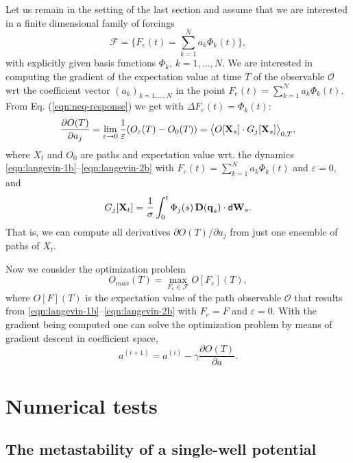 \documentclass[]{tMPH2e}
\newcommand{\vect}[1]{\textbf{\textit{#1}}}
\newcommand{\dd}{\textsf{d}}
\newcommand{\eps}{\varepsilon}
\begin{document}
Let us remain in the setting of the last section and assume that we are interested in a finite dimensional family of forcings
\[
\mathcal{F}=\{F_e(t)=\sum_{k=1}^N a_k \Phi_k(t)\},
\]
with explicitly given basis functions $\Phi_k$, $k=1,\ldots,N$.
We are interested in computing the gradient of the expectation value at time $T$ of the observable $\mathcal{O}$ wrt the coefficient vector $(a_k)_{k=1,\ldots,N}$ in the point $F_e(t)=\sum_{k=1}^N a_k \Phi_k(t)$. From Eq. (\ref{eqn:neq-response}) we get with $\Delta F_e(t)=\Phi_k(t)$:
\[
\frac{\partial O(T)}{\partial a_j} = \lim_{\eps\to 0}\frac{1}{\eps}( O_\eps(T) -
  O_0(T))=\big\langle O[\vect X_s]\cdot G_j[\vect X_s]\big\rangle_{0,T},
\]
where $X_t$ and $O_0$ are paths and expectation value wrt. the dynamics \eqref{eqn:langevin-1b}--\eqref{eqn:langevin-2b} with $F_e(t)=\sum_{k=1}^N a_k \Phi_k(t)$ and $\eps=0$, and
\[
G_j[\vect X_t]
  = \frac{1}\sigma\int_0^t
  \Phi_j(s)\,\vect D(\vect q_s)\cdot\dd\vect W_s. 
\]
That is, we can compute all derivatives $\partial O(T)/\partial a_j$ from just one ensemble of paths of $X_t$. 

Now we consider the optimization problem
\[
O_{max}(T) = \max_{F_e\in \mathcal{F}} O[F_e](T),
\]
where $O[F](T)$ is the expectation value of the path observable $\mathcal{O}$ that results from \eqref{eqn:langevin-1b}--\eqref{eqn:langevin-2b} with $F_e=F$ and $\eps=0$.
With the gradient being computed one can solve the optimization problem by means of gradient descent in coefficient space,
\[
a^{(i+1)}=a^{(i)} -\gamma \frac{\partial O(T)}{\partial a}.
\]


\section{Numerical tests}

\subsection{The metastability of a single-well potential}
\end{document}

